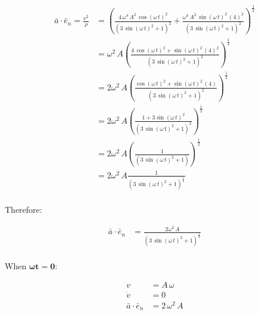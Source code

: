 \documentclass[12pt, letterpaper]{../assignment}
\begin{document}
\begin{equation*}
    \begin{aligned}
\bar{a} \cdot \bar{e}_n  =  \frac{v^2}{\rho} 
&= \left(\frac{4\,\omega ^4\,A^2\,\cos\left(\omega \,t\right)^2}{{\left(3\,{\sin\left(\omega \,t\right)}^2+1\right)}^2}+\frac{\omega ^4\,A^2\,\sin\left(\omega \,t\right)^2\,{\left(4\right)}^2}{{\left(3\,{\sin\left(\omega \,t\right)}^2+1\right)}^2}\right)^\frac{1}{2}\\
&= \omega^2\,A\left(\frac{4\,\cos\left(\omega \,t\right)^2+ \sin\left(\omega \,t\right)^2\,{\left(4\right)}^2}{{\left(3\,{\sin\left(\omega \,t\right)}^2+1\right)}^2}\right)^\frac{1}{2}\\
&= 2\omega^2\,A\left(\frac{\cos\left(\omega \,t\right)^2+ \sin\left(\omega \,t\right)^2\,{\left(4\right)}}{{\left(3\,{\sin\left(\omega \,t\right)}^2+1\right)}^2}\right)^\frac{1}{2}\\
&= 2\omega^2\,A\left(\frac{1+ 3\sin\left(\omega \,t\right)^2}{{\left(3\,{\sin\left(\omega \,t\right)}^2+1\right)}^2}\right)^\frac{1}{2}\\
&= 2\omega^2\,A\left(\frac{1}{{\left(3\,{\sin\left(\omega \,t\right)}^2+1\right)}}\right)^\frac{1}{2}\\
&= 2\omega^2\,A\frac{1}{{\left(3\,{\sin\left(\omega \,t\right)}^2+1\right)}^\frac{1}{2}}\\
\end{aligned}
\end{equation*}

Therefore:

\begin{answer}
\begin{equation*}
\begin{aligned}
\bar{a} \cdot \bar{e}_n
&= \frac{2\omega^2\,A}{{\left(3\,{\sin\left(\omega \,t\right)}^2+1\right)}^\frac{1}{2}}\\
\end{aligned}
\end{equation*}
\end{answer}

When $\bm{\omega t = 0}$:

\begin{answer}
\begin{equation*}
    \begin{aligned}
    v &= A\,\omega \\
    \dot{v} &= 0 \\    
    \bar{a} \cdot \bar{e}_n &= 2\,\omega^2\,{A}
    \end{aligned}
\end{equation*}
\end{answer}
\end{document}
